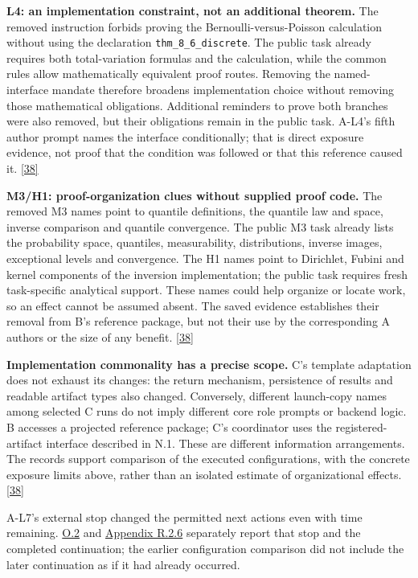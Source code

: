 \textbf{L4: an implementation constraint, not an additional theorem.} The removed instruction forbids proving the Bernoulli-versus-Poisson calculation without using the declaration \nolinkurl{thm_8_6_discrete}. The public task already requires both total-variation formulas and the calculation, while the common rules allow mathematically equivalent proof routes. Removing the named-interface mandate therefore broadens implementation choice without removing those mathematical obligations. Additional reminders to prove both branches were also removed, but their obligations remain in the public task. A-L4's fifth author prompt names the interface conditionally; that is direct exposure evidence, not proof that the condition was followed or that this reference caused it. \href{en.pdf\#ref-38}{\mbox{[38]}}

\textbf{M3/H1: proof-organization clues without supplied proof code.} The removed M3 names point to quantile definitions, the quantile law and space, inverse comparison and quantile convergence. The public M3 task already lists the probability space, quantiles, measurability, distributions, inverse images, exceptional levels and convergence. The H1 names point to Dirichlet, Fubini and kernel components of the inversion implementation; the public task requires fresh task-specific analytical support. These names could help organize or locate work, so an effect cannot be assumed absent. The saved evidence establishes their removal from B's reference package, but not their use by the corresponding A authors or the size of any benefit. \href{en.pdf\#ref-38}{\mbox{[38]}}

\textbf{Implementation commonality has a precise scope.} C's template adaptation does not exhaust its changes: the return mechanism, persistence of results and readable artifact types also changed. Conversely, different launch-copy names among selected C runs do not imply different core role prompts or backend logic. B accesses a projected reference package; C's coordinator uses the registered-artifact interface described in N.1. These are different information arrangements. The records support comparison of the executed configurations, with the concrete exposure limits above, rather than an isolated estimate of organizational effects. \href{en.pdf\#ref-38}{\mbox{[38]}}

A-L7's external stop changed the permitted next actions even with time remaining. \hyperlink{o2}{O.2} and \hyperlink{r2-6}{Appendix R.2.6} separately report that stop and the completed continuation; the earlier configuration comparison did not include the later continuation as if it had already occurred.

